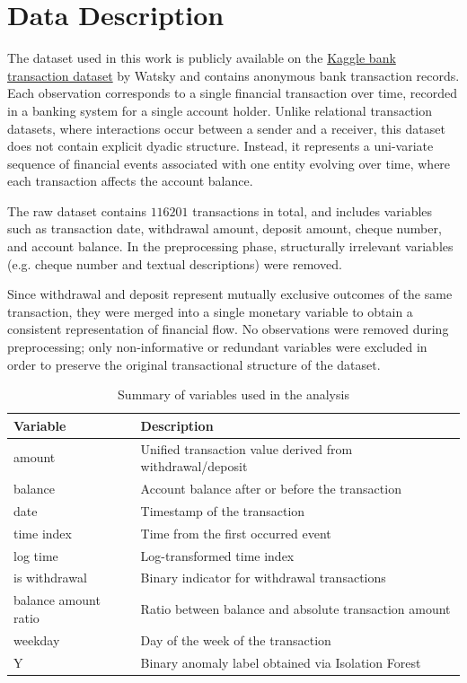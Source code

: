 \documentclass[a4paper,12pt]{article}
\begin{document}
\section{Data Description}
The dataset used in this work is publicly available on the \href{https://www.kaggle.com/datasets/apoorvwatsky/bank-transaction-data}{Kaggle bank transaction dataset} by Watsky and contains anonymous bank transaction records.
Each observation corresponds to a single financial transaction over time, recorded in a banking system for a single account holder.
Unlike relational transaction datasets, where interactions occur between a sender and a receiver, this dataset does not contain explicit dyadic structure.
Instead, it represents a uni-variate sequence of financial events associated with one entity evolving over time, where each transaction affects the account balance.

The raw dataset contains $116201$ transactions in total, and includes variables such as transaction date, withdrawal amount, deposit amount, cheque number, and account balance.
In the preprocessing phase, structurally irrelevant variables (e.g. cheque number and textual descriptions) were removed.

Since withdrawal and deposit represent mutually exclusive outcomes of the same transaction, they were merged into a single monetary variable to obtain a consistent representation of financial flow.
No observations were removed during preprocessing; only non-informative or redundant variables were excluded in order to preserve the original transactional structure of the dataset.

\begin{table}[H]
\centering
\begin{tabular}{ll}
\toprule
\textbf{Variable} & \textbf{Description} \\
\midrule
amount & Unified transaction value derived from withdrawal/deposit \\
balance & Account balance after or before the transaction \\
date & Timestamp of the transaction \\
time index & Time from the first occurred event \\
log time & Log-transformed time index \\
is withdrawal & Binary indicator for withdrawal transactions \\
balance amount ratio & Ratio between balance and absolute transaction amount \\
weekday & Day of the week of the transaction \\
Y & Binary anomaly label obtained via Isolation Forest \\
\bottomrule
\end{tabular}
\caption{Summary of variables used in the analysis}
\end{table}
\end{document}
